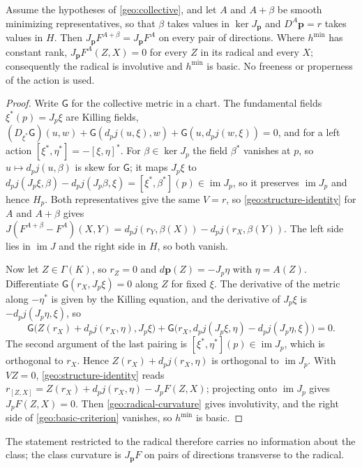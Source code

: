 Assume the hypotheses of \cref{geo:collective}, and let $A$ and $A+\beta$ be smooth minimizing representatives, so that $\beta$ takes values in $\ker J_{\boldsymbol p}$ and $D^A\boldsymbol p=r$ takes values in $H$. Then $J_{\boldsymbol p}F^{A+\beta}=J_{\boldsymbol p}F^A$ on every pair of directions. Where $h^{\min}$ has constant rank, $J_{\boldsymbol p}F^A(Z,X)=0$ for every $Z$ in its radical and every $X$; consequently the radical is involutive and $h^{\min}$ is basic. No freeness or properness of the action is used.
\begin{proof}
Write $\mathsf G$ for the collective metric in a chart. The fundamental fields $\xi^*(p)=J_p\xi$ are Killing fields, $(D_{\xi^*}\mathsf G)(u,w)+\mathsf G(d_pj(u,\xi),w)+\mathsf G(u,d_pj(w,\xi))=0$, and for a left action $[\xi^*,\eta^*]=-[\xi,\eta]^*$. For $\beta\in\ker J_p$ the field $\beta^*$ vanishes at $p$, so $u\mapsto d_pj(u,\beta)$ is skew for $\mathsf G$; it maps $J_p\xi$ to $d_pj(J_p\xi,\beta)-d_pj(J_p\beta,\xi)=[\xi^*,\beta^*](p)\in\operatorname{im}J_p$, so it preserves $\operatorname{im}J_p$ and hence $H_p$. Both representatives give the same $V=r$, so \cref{geo:structure-identity} for $A$ and $A+\beta$ gives $J(F^{A+\beta}-F^A)(X,Y)=d_pj(r_Y,\beta(X))-d_pj(r_X,\beta(Y))$. The left side lies in $\operatorname{im}J$ and the right side in $H$, so both vanish.

Now let $Z\in\Gamma(K)$, so $r_Z=0$ and $d\boldsymbol p(Z)=-J_p\eta$ with $\eta=A(Z)$. Differentiate $\mathsf G(r_X,J_p\xi)=0$ along $Z$ for fixed $\xi$. The derivative of the metric along $-\eta^*$ is given by the Killing equation, and the derivative of $J_p\xi$ is $-d_pj(J_p\eta,\xi)$, so
\begin{equation}
\mathsf G\bigl(Z(r_X)+d_pj(r_X,\eta),J_p\xi\bigr)
+\mathsf G\bigl(r_X,d_pj(J_p\xi,\eta)-d_pj(J_p\eta,\xi)\bigr)=0.
\end{equation}
The second argument of the last pairing is $[\xi^*,\eta^*](p)\in\operatorname{im}J_p$, which is orthogonal to $r_X$. Hence $Z(r_X)+d_pj(r_X,\eta)$ is orthogonal to $\operatorname{im}J_p$. With $VZ=0$, \cref{geo:structure-identity} reads $r_{[Z,X]}=Z(r_X)+d_pj(r_X,\eta)-J_pF(Z,X)$; projecting onto $\operatorname{im}J_p$ gives $J_pF(Z,X)=0$. Then \cref{geo:radical-curvature} gives involutivity, and the right side of \cref{geo:basic-criterion} vanishes, so $h^{\min}$ is basic.
\end{proof}
The statement restricted to the radical therefore carries no information about the class; the class curvature is $J_{\boldsymbol p}F$ on pairs of directions transverse to the radical.

